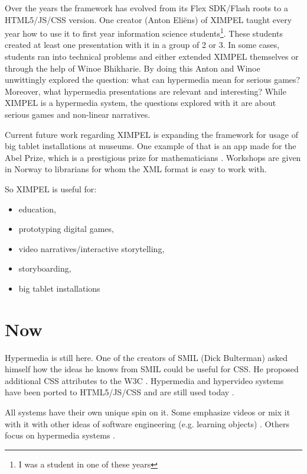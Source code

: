 Over the years the framework has evolved from its Flex SDK/Flash roots to a HTML5/JS/CSS version. One creator (Anton Eli\"ens) of XIMPEL taught every year how to use it to first year information science students\footnote{I was a student in one of these years}. These students created at least one presentation with it in a group of 2 or 3. In some cases, students ran into technical problems and either extended XIMPEL themselves or through the help of Winoe Bhikharie. By doing this Anton and Winoe unwittingly explored the question: what can hypermedia mean for serious games? Moreover, what hypermedia presentations are relevant and interesting? While XIMPEL is a hypermedia system, the questions explored with it are about serious games and non-linear narratives. 

Current future work regarding XIMPEL is expanding the framework for usage of big tablet installations at museums. One example of that is an app made for the Abel Prize, which is a prestigious prize for mathematicians \cite{abel_prize}. Workshops are given in Norway to librarians for whom the XML format is easy to work with. 

So XIMPEL is useful for:
\begin{itemize}  
    \item education,
    \item prototyping digital games,
    \item video narratives/interactive storytelling,
    \item storyboarding,
    \item big tablet installations
\end{itemize}


\section{Now}
Hypermedia is still here. One of the creators of SMIL (Dick Bulterman) asked himself how the ideas he knows from SMIL could be useful for CSS. He  proposed additional CSS attributes to the W3C \cite{timestylesheets2014}. Hypermedia and hypervideo systems have been ported to HTML5/JS/CSS and are still used today \cite{meixner2016, celentano2017, busson2017}. 

All systems have their own unique spin on it. Some emphasize videos  \cite{meixner2016} or mix it with it with other ideas of software engineering (e.g. learning objects) \cite{busson2017}. Others focus on hypermedia systems \cite{celentano2017}. 

